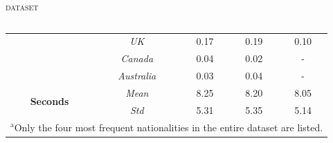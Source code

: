 \documentclass[10pt,aspectratio=1610,professionalfont]{beamer}
\begin{document}
\begin{frame}{\textsc{dataset}}
\begin{columns}
\begin{column}{0.5\textwidth}
\begin{center}
\begin{table}[htbp]
\begin{center}
{\begin{tabular}{|c|c|c|c|c|}
				        & \textit{UK} & 0.17 & 0.19 & 0.10 \\
				        & \textit{Canada} & 0.04 & 0.02 & - \\
				        & \textit{Australia} & 0.03 & 0.04 & - \\
				        \hline
				        \multirow{2}{*}{\textbf{Seconds}} & \textit{Mean} & 8.25 & 8.20 & 8.05 \\
				        & \textit{Std} & 5.31 & 5.35 & 5.14 \\
				        \hline
				        \multicolumn{5}{l}{$^{\mathrm{a}}$Only the four most frequent nationalities in the entire dataset are listed.}
				        \end{tabular}
				   }
				        \label{tab:dataset}
				    \end{center}
				\end{table}
		\end{center}
		\end{column}
	\end{columns}
   
\end{frame}
\end{document}
